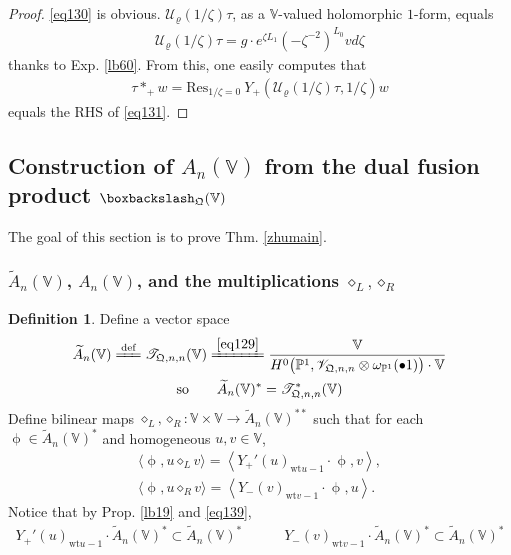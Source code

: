 \documentclass[11pt,b5paper,notitlepage]{article}
\theoremstyle{definition}
\newtheorem{df}{Definition}[section]
\theoremstyle{plain}
\newcommand{\mc}{\mathcal}
\newcommand{\wtd}{\widetilde}
\newcommand{\Res}{\mathrm{Res}}
\newcommand{\SV}{\mathscr{V}}
\newcommand{\scr}{\mathscr}
\newcommand{\Vbb}{\mathbb V}
\newcommand{\Pbb}{\mathbb P}
\newcommand{\wt}{\mathrm{wt}}
\newcommand{\<}{\left\langle}
\renewcommand{\>}{\right\rangle}
\newcommand{\ST}{\mathscr{T}}
\newcommand{\bk}[1]{\langle {#1}\rangle}
\newcommand{\bbs}{\boxbackslash}
\newcommand{\fq}{{\mathfrak Q}}
\numberwithin{equation}{section}
\begin{document}
\begin{proof}
\eqref{eq130} is obvious.  
$\mc U_\varrho(1/\zeta)\tau$, as a $\Vbb$-valued holomorphic $1$-form, equals 
\begin{align*}
\mc U_\varrho(1/\zeta)\tau=g\cdot e^{\zeta L_1}(-\zeta^{-2})^{L_0}vd\zeta
\end{align*}
thanks to Exp. \ref{lb60}. From this, one easily computes that
\begin{align*}
\tau *_+ w=\Res_{1/\zeta=0}~Y_+(\mc U_\varrho(1/\zeta)\tau,1/\zeta)w
\end{align*}
equals the RHS of \eqref{eq131}.
\end{proof}






\subsection{Construction of $A_n(\Vbb)$ from the dual fusion product $\bbs_\fq(\Vbb)$}


The goal of this section is to prove Thm. \ref{zhumain}.


\subsubsection{$\wtd A_n(\Vbb)$, $A_n(\Vbb)$, and the multiplications $\diamond_L,\diamond_R$}



\begin{df}
Define a vector space \index{AV@$\wtd A_n(\Vbb)$}
\begin{gather}\label{eq134}
\wtd A_n(\Vbb)\xlongequal{\text{def}}\ST_{\fq,n,n}(\Vbb)\xlongequal{\eqref{eq129}}\frac{\Vbb}{H^0\big(\Pbb^1, \SV_{\fq,n,n}\otimes \omega_{\Pbb^1}(\bullet 1)\big)\cdot \Vbb}\\
\text{so}\qquad\wtd A_n(\Vbb)^*=\scr T_{\fq,n,n}^*(\Vbb) \nonumber
\end{gather}
Define bilinear maps $\diamond_L,\diamond_R:\Vbb\times \Vbb\rightarrow \wtd A_n(\Vbb)^{**}$  such that for each $\upphi\in \wtd A_n(\Vbb)^*$ and homogeneous $u,v\in \Vbb$, 
\begin{subequations}\label{zhu6}
\begin{gather}
\bk{\upphi,u\diamond_L v}=\<Y_+'(u)_{\wt u-1}\cdot \upphi,v\>, \label{eq132}\\
\bk{\upphi,u\diamond_R v}=\<Y_-(v)_{\wt v-1}\cdot \upphi,u\>.  \label{eq133}
\end{gather}
\end{subequations}
Notice that by Prop. \ref{lb19} and \eqref{eq139}, 
\begin{align}\label{eq135}
Y_+'(u)_{\wt u-1}\cdot \wtd A_n(\Vbb)^*\subset \wtd A_n(\Vbb)^*\qquad\quad Y_-(v)_{\wt v-1}\cdot \wtd A_n(\Vbb)^*\subset \wtd A_n(\Vbb)^*
\end{align}
\end{df}
\end{document}
